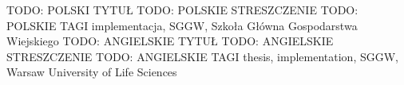\abstractpage
{TODO: POLSKI TYTUŁ}
{TODO: POLSKIE STRESZCZENIE}
{TODO: POLSKIE TAGI implementacja, SGGW, Szkoła Główna Gospodarstwa Wiejskiego}
{TODO: ANGIELSKIE TYTUŁ}
{TODO: ANGIELSKIE STRESZCZENIE}
{TODO: ANGIELSKIE TAGI thesis, implementation, SGGW, Warsaw University of Life Sciences}
